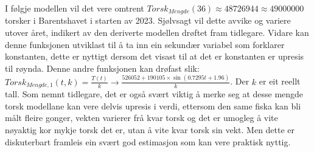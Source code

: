 \documentclass{report}
\begin{document}
I følgje modellen vil det vere omtrent $Torsk_{Mengde}(36)\approx 48726944 \approx 49000000$ torsker i Barentshavet i starten av 2023. Sjølvsagt vil dette avvike og variere utover året, indikert av den deriverte modellen drøftet fram tidlegare.
Vidare kan denne funksjonen utviklast til å ta inn ein sekundær variabel som forklarer konstanten, dette er nyttigt dersom det visast til at det er konstanten er upresis til røynda.
Denne andre funksjonen kan drøfast slik: $Torsk_{Mengde,1}(t,k)=\frac{T(t)}{k}\rightarrow \frac{526052+190105\times \sin(0.7295t+1.96)}{k}$. Der $k$ er eit reellt tall.
Som nemnt tidlegare, det er også svært viktig å merke seg at desse mengde torsk modellane kan vere delvis upresis i verdi, ettersom den same fiska kan bli målt fleire gonger, vekten varierer frå kvar torsk og det er umogleg å vite nøyaktig kor mykje torsk det er, utan å vite kvar torsk sin vekt.
Men dette er diskuterbart framleis ein svært god estimasjon som kan vere praktisk nyttig.
\end{document}
